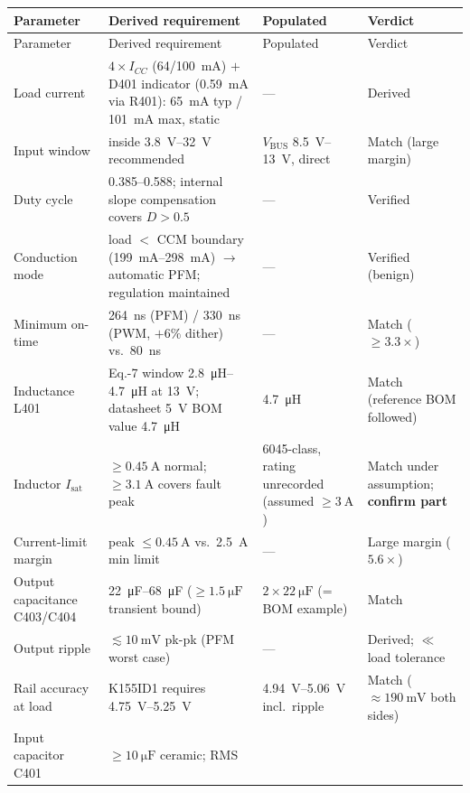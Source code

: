 \begin{longtable}{@{}p{}p{}p{}p{}@{}}
\toprule
Parameter & Derived requirement & Populated & Verdict \\
\midrule
\endfirsthead
\toprule
Parameter & Derived requirement & Populated & Verdict \\
\midrule
\endhead
\bottomrule
\endlastfoot
Load current & $4\times I_{CC}$ (64/100~mA) $+$ D401 indicator
  (\SI{0.59}{\milli\ampere} via R401): \SI{65}{\milli\ampere} typ /
  \SI{101}{\milli\ampere} max, static & --- & Derived \\
Input window & inside \SIrange{3.8}{32}{\volt} recommended &
  $V_{\mathrm{BUS}}$ \SIrange{8.5}{13}{\volt}, direct & Match (large margin) \\
Duty cycle & 0.385--0.588; internal slope compensation covers $D>0.5$ & --- &
  Verified \\
Conduction mode & load $<$ CCM boundary (\SIrange{199}{298}{\milli\ampere})
  $\rightarrow$ automatic PFM; regulation maintained & --- & Verified (benign) \\
Minimum on-time & \SI{264}{\nano\second} (PFM) / \SI{330}{\nano\second} (PWM,
  $+6\%$ dither) vs.\ \SI{80}{\nano\second} & --- & Match ($\geq 3.3\times$) \\
Inductance L401 & Eq.-7 window \SIrange{2.8}{4.7}{\micro\henry} at \SI{13}{\volt};
  datasheet 5~V BOM value \SI{4.7}{\micro\henry} & \SI{4.7}{\micro\henry}
  & Match (reference BOM followed) \\
Inductor $I_{\mathrm{sat}}$ & $\geq\SI{0.45}{\ampere}$ normal;
  $\geq\SI{3.1}{\ampere}$ covers fault peak & 6045-class, rating unrecorded
  (assumed $\geq\SI{3}{\ampere}$) & Match under assumption; \textbf{confirm part} \\
Current-limit margin & peak $\leq\SI{0.45}{\ampere}$ vs.\ \SI{2.5}{\ampere} min
  limit & --- & Large margin ($5.6\times$) \\
Output capacitance C403/C404 & \SIrange{22}{68}{\micro\farad}
  ($\geq\SI{1.5}{\micro\farad}$ transient bound) & $2\times\SI{22}{\micro\farad}$
  (= BOM example) & Match \\
Output ripple & $\lesssim\SI{10}{\milli\volt}$ pk-pk (PFM worst case) & --- &
  Derived; $\ll$ load tolerance \\
Rail accuracy at load & K155ID1 requires \SIrange{4.75}{5.25}{\volt} &
  \SIrange{4.94}{5.06}{\volt} incl.\ ripple & Match ($\approx\SI{190}{\milli\volt}$
  both sides) \\
Input capacitor C401 & $\geq\SI{10}{\micro\farad}$ ceramic; RMS

\end{longtable}
